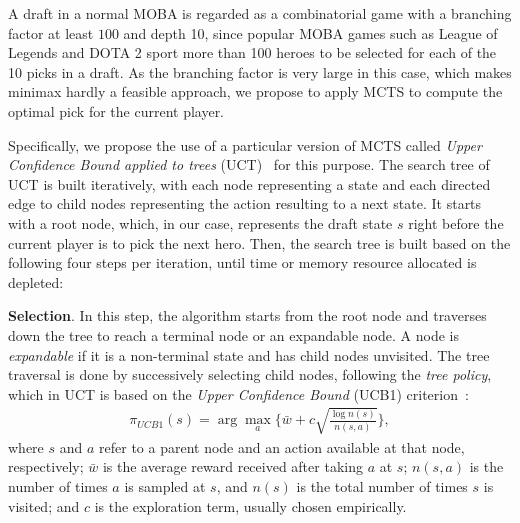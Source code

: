 
A draft in a normal MOBA is regarded as a combinatorial game with a branching factor at least $100$ and depth 10, since popular MOBA games such as League of Legends and DOTA 2 sport more than 100 heroes to be selected for each of the 10 picks in a draft. As the branching factor is very large in this case, which makes minimax hardly a feasible approach, we propose to apply MCTS to compute the optimal pick for the current player. 








Specifically, we propose the use of a particular version of MCTS called \textit{Upper Confidence Bound applied to trees} (UCT)~\cite{kocsis2006bandit} for this purpose. The search tree of UCT is built iteratively, with each node representing a state and each directed edge to child nodes representing the action resulting to a next state. It starts with a root node, which, in our case, represents the draft state $s$ right before the current player is to pick the next hero. Then, the search tree is built based on the following four steps per iteration, until time or memory resource allocated is depleted:


\textbf{Selection}. In this step, the algorithm starts from the root node and traverses down the tree to reach a terminal node or an expandable node. A node is \textit{expandable} if it is a non-terminal state and has child nodes unvisited. The tree traversal is done by successively selecting child nodes, following the \textit{tree policy}, which in UCT is based on the \textit{Upper Confidence Bound} (UCB1) criterion~\cite{auer2002finite}:
    \begin{equation}
    \begin{aligned}
    \pi_{UCB1}(s) = \arg\max_a \Big\{ \bar{w} + c \sqrt{\frac{\log n(s)}{n(s, a)}} \Big\},
    \label{eqn:ucb}
    \end{aligned}
    \end{equation}
where $s$ and $a$ refer to a parent node and an action available at that node, respectively; $\bar{w}$ is the average reward received after taking $a$ at $s$; $n(s,a)$ is the number of times $a$ is sampled at $s$, and $n(s)$ is the total number of times $s$ is visited; and $c$ is the exploration term, usually chosen empirically. 

